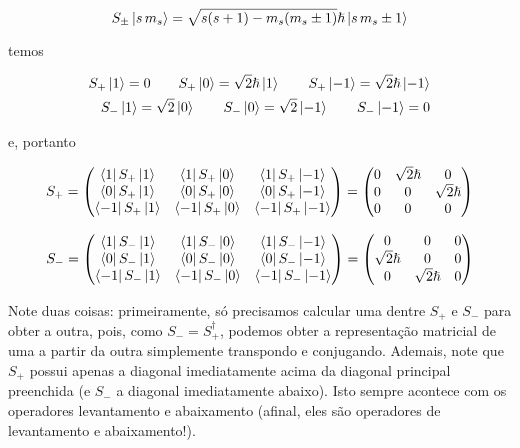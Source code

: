 \documentclass[a4paper, 12pt, notitlepage]{article}
\begin{document}
\begin{enumerate}
\[ S_\pm \ket{s\,m_s} = \sqrt{s(s+1) - m_s(m_s \pm 1)}\hslash\ket{s\,m_s\pm 1} \]

\noindent temos

\begin{align*}
  S_+ \ket{1} = 0 \qquad S_+ \ket{0} = \sqrt{2}\hslash\ket{1} \qquad S_+ \ket{-1} = \sqrt{2} \hslash \ket{-1} \\
  S_- \ket{1} = \sqrt{2} \ket{0} \qquad S_- \ket{0} = \sqrt{2} \ket{-1} \qquad S_- \ket{-1} = 0
\end{align*}

\noindent e, portanto

\[
  S_+ = \begin{pmatrix} 
  \bra{1} S_+ \ket{1} & \bra{1} S_+ \ket{0} & \bra{1} S_+ \ket{-1} \\
  \bra{0} S_+ \ket{1} & \bra{0} S_+ \ket{0} & \bra{0} S_+ \ket{-1} \\
  \bra{-1} S_+ \ket{1} & \bra{-1} S_+ \ket{0} & \bra{-1} S_+ \ket{-1}
\end{pmatrix}
=
\begin{pmatrix}
  0 & \sqrt{2} \hslash & 0 \\
  0 & 0 & \sqrt{2} \hslash \\
  0 & 0 & 0
\end{pmatrix}
\]

\[
  S_- = \begin{pmatrix} 
  \bra{1} S_- \ket{1} & \bra{1} S_- \ket{0} & \bra{1} S_- \ket{-1} \\
  \bra{0} S_- \ket{1} & \bra{0} S_- \ket{0} & \bra{0} S_- \ket{-1} \\
  \bra{-1} S_- \ket{1} & \bra{-1} S_- \ket{0} & \bra{-1} S_- \ket{-1}
\end{pmatrix}
=
\begin{pmatrix}
  0 & 0 & 0 \\
  \sqrt{2}\hslash & 0 & 0 \\
  0 & \sqrt{2}\hslash & 0
\end{pmatrix}
\]

Note duas coisas: primeiramente, só precisamos calcular uma dentre $S_+$ e $S_-$ para obter a outra, pois, como $S_- = S_+^\dagger$, podemos obter a representação matricial de uma a partir da outra simplemente transpondo e conjugando. Ademais, note que $S_+$ possui apenas a diagonal imediatamente acima da diagonal principal preenchida (e $S_-$ a diagonal imediatamente abaixo). Isto sempre acontece com os operadores levantamento e abaixamento (afinal, eles são operadores de levantamento e abaixamento!).


\end{enumerate}
\end{document}
